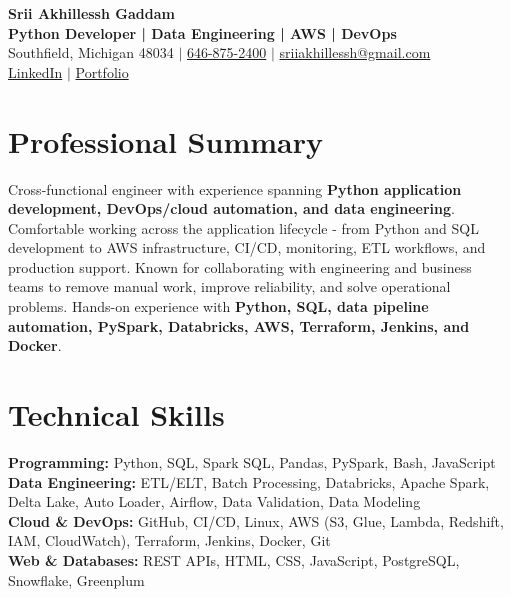 \documentclass[letterpaper,10pt]{article}
\begin{document}
\fontsize{9.35pt}{10.45pt}\selectfont

\begin{center}
    {\LARGE \textbf{Srii Akhillessh Gaddam}} \\[-1pt]
    \textbf{Python Developer | Data Engineering | AWS | DevOps} \\[2pt]
    Southfield, Michigan 48034 $|$
    \href{tel:6468752400}{646-875-2400} $|$
    \href{mailto:sriiakhillessh@gmail.com}{sriiakhillessh@gmail.com} \\[1pt]
    \href{https://www.linkedin.com/in/srii-akhiilessh-gaddam-b48668191/}{LinkedIn} $|$
    \href{https://sriiakhillesshg.github.io/portfolio/}{Portfolio}
\end{center}
\vspace{-8pt}

\section{Professional Summary}
\small{Cross-functional engineer with experience spanning \textbf{Python application development, DevOps/cloud automation, and data engineering}. Comfortable working across the application lifecycle - from Python and SQL development to AWS infrastructure, CI/CD, monitoring, ETL workflows, and production support. Known for collaborating with engineering and business teams to remove manual work, improve reliability, and solve operational problems. Hands-on experience with \textbf{Python, SQL, data pipeline automation, PySpark, Databricks, AWS, Terraform, Jenkins, and Docker}.}

\section{Technical Skills}
\small{
\textbf{Programming:} Python, SQL, Spark SQL, Pandas, PySpark, Bash, JavaScript \\
\textbf{Data Engineering:} ETL/ELT, Batch Processing, Databricks, Apache Spark, Delta Lake, Auto Loader, Airflow, Data Validation, Data Modeling \\
\textbf{Cloud \& DevOps:} GitHub, CI/CD, Linux, AWS (S3, Glue, Lambda, Redshift, IAM, CloudWatch), Terraform, Jenkins, Docker, Git \\
\textbf{Web \& Databases:} REST APIs, HTML, CSS, JavaScript, PostgreSQL, Snowflake, Greenplum
}
\end{document}
